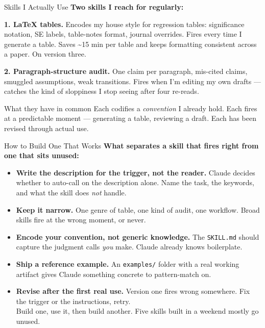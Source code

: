\documentclass[aspectratio=169, 11pt]{beamer}
\begin{document}
\begin{frame}{Skills I Actually Use}
  \textbf{Two skills I reach for regularly:}

  \vspace{0.6em}
  \textbf{1. \LaTeX{} tables.} Encodes my house style for regression tables: significance notation, SE labels, table-notes format, journal overrides. Fires every time I generate a table. Saves \textasciitilde{}15 min per table and keeps formatting consistent across a paper. On version three.

  \vspace{0.7em}
  \textbf{2. Paragraph-structure audit.} One claim per paragraph, mis-cited claims, smuggled assumptions, weak transitions. Fires when I'm editing my own drafts --- catches the kind of sloppiness I stop seeing after four re-reads.

  \vspace{0.8em}
  \begin{block}{What they have in common}
    Each codifies a \emph{convention} I already hold. Each fires at a predictable moment --- generating a table, reviewing a draft. Each has been revised through actual use.
  \end{block}
\end{frame}


\begin{frame}{How to Build One That Works}
  \textbf{What separates a skill that fires right from one that sits unused:}

  \vspace{0.3em}
  \begin{itemize}
    \item \textbf{Write the description for the trigger, not the reader.} Claude decides whether to auto-call on the description alone. Name the task, the keywords, and what the skill does \emph{not} handle.

    \item \textbf{Keep it narrow.} One genre of table, one kind of audit, one workflow. Broad skills fire at the wrong moment, or never.

    \item \textbf{Encode your convention, not generic knowledge.} The \texttt{SKILL.md} should capture the judgment calls \emph{you} make. Claude already knows boilerplate.

    \item \textbf{Ship a reference example.} An \texttt{examples/} folder with a real working artifact gives Claude something concrete to pattern-match on.

    \item \textbf{Revise after the first real use.} Version one fires wrong somewhere. Fix the trigger or the instructions, retry.\\ \alert{Build one, use it, then build another. Five skills built in a weekend mostly go unused.} \hfill \hyperlink{skillextras}{}
  \end{itemize}
\end{frame}
\end{document}

